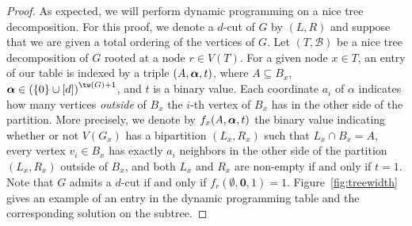 \begin{proof}
    As expected, we will perform dynamic programming on a nice tree decomposition.
    For this proof, we denote a $d$-cut of $G$ by $(L, R)$ and suppose that we are given a total ordering of the vertices of $G$.
    Let $(T, \mathcal{B})$ be a nice tree decomposition of $G$ rooted at a node $r \in V(T)$.
    For a given node $x \in T$, an entry of our table is indexed by a triple $(A, \boldsymbol{\alpha}, t)$, where $A \subseteq B_x$, $\balpha \in \left(\{0\} \cup [d]\right)^{\tw(G)+1}$, and $t$ is a binary value. Each coordinate $a_i$ of $\alpha$ indicates how many vertices \textit{outside} of $B_x$ the $i$-th vertex of $B_x$ has in the other side of the partition. More precisely, we denote by $f_x(A, \boldsymbol{\alpha}, t)$ the binary value indicating whether or not $V(G_x)$ has a bipartition $(L_x,R_x)$ such that $L_x \cap B_x = A$, every vertex $v_i \in B_x$ has exactly $a_i$ neighbors in the other side of the partition $(L_x,R_x)$  outside of $B_x$, and both $L_x$ and $R_x$ are non-empty if and only if $t = 1$. Note that $G$ admits a $d$-cut if and only if $f_r(\emptyset, \boldsymbol{0}, 1)=1$.
    Figure~\ref{fig:treewidth} gives an example of an entry in the dynamic programming table and the corresponding solution on the subtree.




\end{proof}

